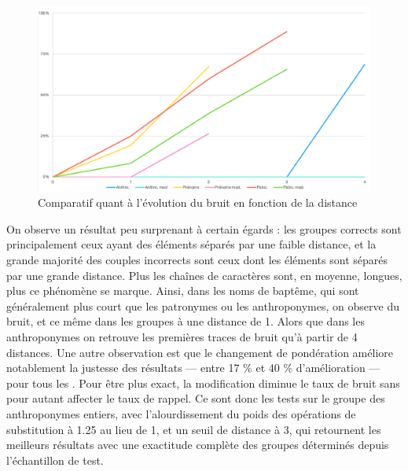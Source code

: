 \begin{figure}[ht] %
    \centering
    \includegraphics[scale=0.5]{3.Results/Img/noise_rate.png}
    \caption{Comparatif quant à l'évolution du bruit en fonction de la distance}
    \label{graph_methode_cluster}
\end{figure}

On observe un résultat peu surprenant à certain égards : les groupes corrects sont principalement ceux ayant des éléments séparés par une faible distance, et la grande majorité des couples incorrects sont ceux dont les éléments sont séparés par une grande distance. 
Plus les chaînes de caractères sont, en moyenne, longues, plus ce phénomène se marque.
Ainsi, dans les noms de baptême, qui sont généralement plus court que les patronymes ou les anthroponymes, on observe du bruit, et ce même dans les groupes à une distance de 1. Alors que dans les anthroponymes on retrouve les premières traces de bruit qu’à partir de 4 distances.
Une autre observation est que le changement de pondération améliore notablement la justesse des résultats --- entre 17 \% et 40 \% d'amélioration  --- pour tous les . Pour être plus exact, la modification diminue le taux de bruit sans pour autant affecter le taux de rappel.
Ce sont donc les tests sur le groupe des anthroponymes entiers, avec l'alourdissement du poids des opérations de substitution à 1.25 au lieu de 1, et un seuil de distance à 3, qui retournent les meilleurs résultats avec une exactitude complète des groupes déterminés depuis l'échantillon de test.

